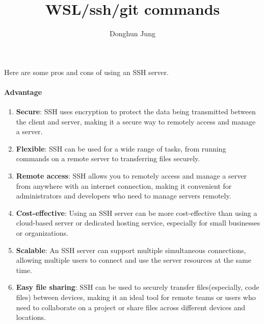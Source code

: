 \documentclass[10pt, a4paper]{article}
\title{WSL/ssh/git commands}
\author{Donghun Jung}
\date{}
\begin{document}
\maketitle
Here are some pros and cons of using an SSH server.
\paragraph*{Advantage}
\begin{enumerate}
    \item \textbf{Secure}: SSH uses encryption to protect the data being transmitted between the client and server, making it a secure way to remotely access and manage a server.
    \item \textbf{Flexible}: SSH can be used for a wide range of tasks, from running commands on a remote server to transferring files securely.
    \item \textbf{Remote access}: SSH allows you to remotely access and manage a server from anywhere with an internet connection, making it convenient for administrators and developers who need to manage servers remotely.
    \item \textbf{Cost-effective}: Using an SSH server can be more cost-effective than using a cloud-based server or dedicated hosting service, especially for small businesses or organizations.
    \item \textbf{Scalable}: An SSH server can support multiple simultaneous connections, allowing multiple users to connect and use the server resources at the same time.
    \item \textbf{Easy file sharing}: SSH can be used to securely transfer files(especially, code files) between devices, making it an ideal tool for remote teams or users who need to collaborate on a project or share files across different devices and locations.
\end{enumerate}
\end{document}
